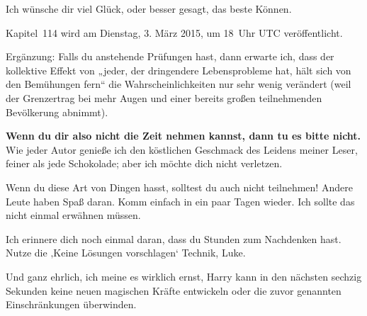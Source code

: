 {%
Ich wünsche dir viel Glück, oder besser gesagt, das beste Können.

Kapitel~114 wird am Dienstag, 3. März 2015, um 18~Uhr UTC veröffentlicht.

Ergänzung:
Falls du anstehende Prüfungen hast, dann erwarte ich, dass der kollektive Effekt von „jeder, der dringendere Lebensprobleme hat, hält sich von den Bemühungen fern“ die Wahrscheinlichkeiten nur sehr wenig verändert (weil der Grenzertrag bei mehr Augen und einer bereits großen teilnehmenden Bevölkerung abnimmt).

\textbf{Wenn du dir also nicht die Zeit nehmen kannst, dann tu es bitte nicht.} Wie jeder Autor genieße ich den köstlichen Geschmack des Leidens meiner Leser, feiner als jede Schokolade; aber ich möchte dich nicht verletzen.

Wenn du diese Art von Dingen hasst, solltest du auch nicht teilnehmen! Andere Leute haben Spaß daran. Komm einfach in ein paar Tagen wieder. Ich sollte das nicht einmal erwähnen müssen.

Ich erinnere dich noch einmal daran, dass du Stunden zum Nachdenken hast. Nutze die ‚Keine Lösungen vorschlagen‘ Technik, Luke.

Und ganz ehrlich, ich meine es wirklich ernst, Harry kann in den nächsten sechzig Sekunden keine neuen magischen Kräfte entwickeln oder die zuvor genannten Einschränkungen überwinden.

\later

}
